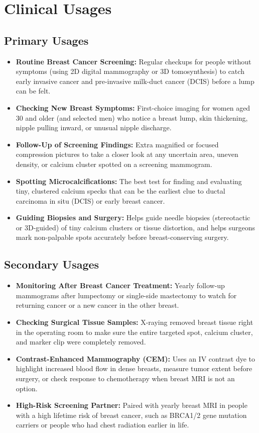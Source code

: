 \section{Clinical Usages}

\subsection{Primary Usages}

\begin{itemize}
    \item \textbf{Routine Breast Cancer Screening:} Regular checkups for people without symptoms (using 2D digital mammography or 3D tomosynthesis) to catch early invasive cancer and pre-invasive milk-duct cancer (DCIS) before a lump can be felt.
    \item \textbf{Checking New Breast Symptoms:} First-choice imaging for women aged 30 and older (and selected men) who notice a breast lump, skin thickening, nipple pulling inward, or unusual nipple discharge.
    \item \textbf{Follow-Up of Screening Findings:} Extra magnified or focused compression pictures to take a closer look at any uncertain area, uneven density, or calcium cluster spotted on a screening mammogram.
    \item \textbf{Spotting Microcalcifications:} The best test for finding and evaluating tiny, clustered calcium specks that can be the earliest clue to ductal carcinoma in situ (DCIS) or early breast cancer.
    \item \textbf{Guiding Biopsies and Surgery:} Helps guide needle biopsies (stereotactic or 3D-guided) of tiny calcium clusters or tissue distortion, and helps surgeons mark non-palpable spots accurately before breast-conserving surgery.
\end{itemize}

\subsection{Secondary Usages}

\begin{itemize}
    \item \textbf{Monitoring After Breast Cancer Treatment:} Yearly follow-up mammograms after lumpectomy or single-side mastectomy to watch for returning cancer or a new cancer in the other breast.
    \item \textbf{Checking Surgical Tissue Samples:} X-raying removed breast tissue right in the operating room to make sure the entire targeted spot, calcium cluster, and marker clip were completely removed.
    \item \textbf{Contrast-Enhanced Mammography (CEM):} Uses an IV contrast dye to highlight increased blood flow in dense breasts, measure tumor extent before surgery, or check response to chemotherapy when breast MRI is not an option.
    \item \textbf{High-Risk Screening Partner:} Paired with yearly breast MRI in people with a high lifetime risk of breast cancer, such as BRCA1/2 gene mutation carriers or people who had chest radiation earlier in life.
\end{itemize}

